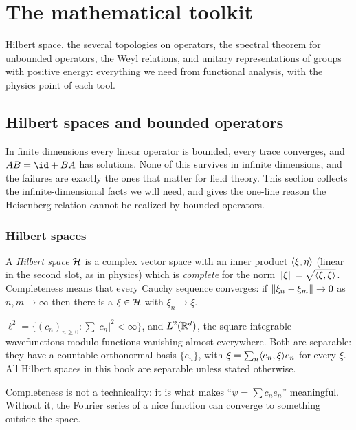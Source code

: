 \chapter{The mathematical toolkit}\label{ch:toolkit}

Hilbert space, the several topologies on operators, the spectral theorem for unbounded operators, the Weyl relations, and unitary representations of groups with positive energy: everything we need from functional analysis, with the physics point of each tool.

\section{Hilbert spaces and bounded operators}\label{ch:hilbert}

\begin{physmotiv}
In finite dimensions every linear operator is bounded, every trace converges, and $AB=\id+BA$ has solutions. None of this survives in infinite dimensions, and the failures are exactly the ones that matter for field theory. This section collects the infinite-dimensional facts we will need, and gives the one-line reason the Heisenberg relation cannot be realized by bounded operators.
\end{physmotiv}

\subsection{Hilbert spaces}

A \emph{Hilbert space} $\mathcal{H}$ is a complex vector space with an inner product $\langle \xi,\eta\rangle$ (linear in the second slot, as in physics) which is \emph{complete} for the norm $\lVert \xi\rVert=\sqrt{\langle \xi,\xi\rangle}$. Completeness means that every Cauchy sequence converges: if $\lVert \xi_n-\xi_m\rVert\to0$ as $n,m\to\infty$ then there is a $\xi\in\mathcal{H}$ with $\xi_n\to\xi$.

\begin{example}
$\ell^2=\{(c_n)_{n\ge0}:\sum|c_n|^2<\infty\}$, and $L^2(\mathbb{R}^d)$, the square-integrable wavefunctions modulo functions vanishing almost everywhere. Both are separable: they have a countable orthonormal basis $\{e_n\}$, with $\xi=\sum_n\langle e_n,\xi\rangle e_n$ for every $\xi$. All Hilbert spaces in this book are separable unless stated otherwise.
\end{example}

Completeness is not a technicality: it is what makes ``$\psi=\sum c_ne_n$'' meaningful. Without it, the Fourier series of a nice function can converge to something outside the space.

